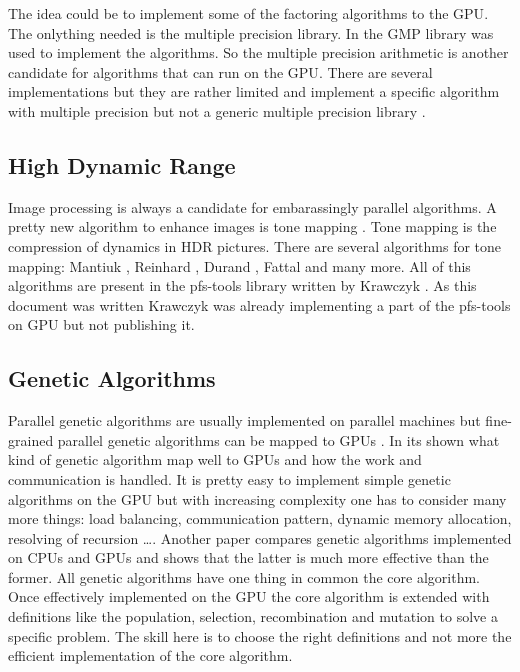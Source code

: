 The idea could be to implement some of the factoring algorithms to the \gls{GPU}.
The onlything needed is the multiple precision library. In \citep{citeulike:3783254} the
\gls{GMP} library was used to implement the algorithms. So
the multiple precision arithmetic is another candidate for algorithms that can
run on the \gls{GPU}. There are several implementations but they are rather limited
and implement a specific algorithm with multiple precision but not a generic multiple
precision library \citep{citeulike:6661955, citeulike:6661957}. 


\subsection{High Dynamic Range} %
\label{par:high_dynamic_range}
Image processing is always a candidate for embarassingly parallel algorithms. A
pretty new algorithm to enhance images is tone mapping
\citep{citeulike:3783303}. Tone mapping is the compression of dynamics in
\gls{HDR} pictures. There are several algorithms for tone mapping: Mantiuk
\citep{citeulike:3783315}, Reinhard \citep{citeulike:3783311}, Durand
\citep{citeulike:789299}, Fattal \citep{citeulike:3783313} and many more. All of
this algorithms are present in the pfs-tools library written by Krawczyk
\citep{citeulike:3783303}. As this document was written Krawczyk was already
implementing a part of the pfs-tools on \gls{GPU} but not publishing it. 


\subsection{Genetic Algorithms} %
\label{par:genetic_algorithms}
Parallel genetic algorithms are usually implemented on parallel machines but
fine-grained parallel genetic algorithms can be mapped to \glspl{GPU}
\citep{citeulike:3801879}. In \citep{citeulike:3801866} its shown what kind of
genetic algorithm map well to \glspl{GPU} and how the work and communication is
handled. It is pretty easy to implement simple genetic algorithms on the
\gls{GPU} but with increasing complexity one has to consider many more things: load
balancing, communication pattern, dynamic memory allocation, resolving of
recursion \ldots . Another paper \citep{citeulike:3801883} compares genetic
algorithms implemented on \glspl{CPU} and \glspl{GPU} and shows that the latter is much more
effective than the former. All genetic algorithms have one thing in common the
core algorithm. Once effectively implemented on the \gls{GPU} the core algorithm is
extended with definitions like the population, selection, recombination and
mutation to solve a specific problem. The skill here is to choose the right
definitions and not more the efficient implementation of the core algorithm. 

